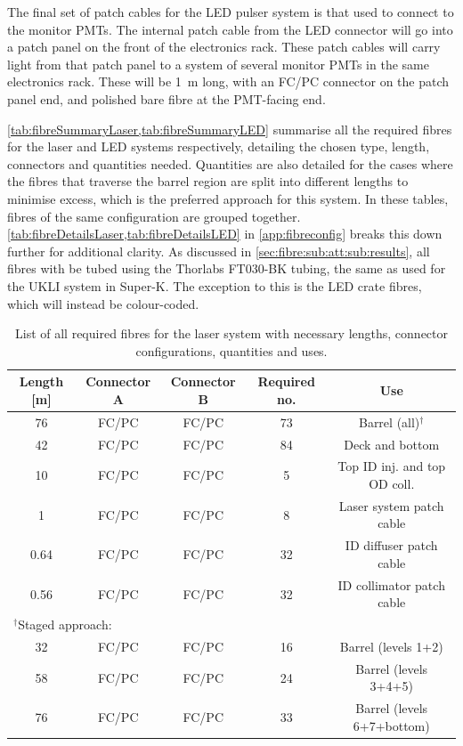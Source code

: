 \documentclass[a4paper,11pt]{article}
\begin{document}
The final set of patch cables for the LED pulser system is that used to connect to the monitor PMTs. The internal patch cable from the LED connector will go into a patch panel on the front of the electronics rack. These patch cables will carry light from that patch panel to a system of several monitor PMTs in the same electronics rack. These will be 1~m long, with an FC/PC connector on the patch panel end, and polished bare fibre at the PMT-facing end.

\cref{tab:fibreSummaryLaser,tab:fibreSummaryLED} summarise all the required fibres for the laser and LED systems respectively, detailing the chosen type, length, connectors and quantities needed. Quantities are also detailed for the cases where the fibres that traverse the barrel region are split into different lengths to minimise excess, which is the preferred approach for this system. In these tables, fibres of the same configuration are grouped together. \cref{tab:fibreDetailsLaser,tab:fibreDetailsLED} in \cref{app:fibreconfig} breaks this down further for additional clarity. As discussed in \cref{sec:fibre:sub:att:sub:results}, all fibres with be tubed using the Thorlabs FT030-BK tubing, the same as used for the UKLI system in Super-K. The exception to this is the LED crate fibres, which will instead be colour-coded.

\begin{table}[h]
\centering
\setlength{\tabcolsep}{4pt}
\begin{tabular}{ccccc}
\toprule
Length [m]	&	Connector A	&	Connector B	&	Required no.	&	Use		\\ \midrule
76			&	FC/PC		&	FC/PC		&	73				&	Barrel (all)$^\dagger$	\\
42			&	FC/PC		&	FC/PC		&	84				&	Deck and bottom	\\
10			&	FC/PC		&	FC/PC		&	5				&	Top ID inj. and top OD coll. \\
1			&	FC/PC		&	FC/PC		&	8				&	Laser system patch cable \\
0.64		&	FC/PC		&	FC/PC		&	32				&	ID diffuser patch cable	\\
0.56		&	FC/PC		&	FC/PC		&	32				&	ID collimator patch cable	\\ \midrule
\multicolumn{3}{l}{$^\dagger$Staged approach:}			&					&			\\
32			&	FC/PC		&	FC/PC		&	16				&	Barrel (levels 1+2) \\
58			&	FC/PC		&	FC/PC		&	24				&	Barrel (levels 3+4+5)	\\
76			&	FC/PC		&	FC/PC		&	33				&	Barrel (levels 6+7+bottom)	\\
\bottomrule
\end{tabular}
\caption{List of all required fibres for the laser system with necessary lengths, connector configurations, quantities and uses.}\label{tab:fibreSummaryLaser}
\end{table}
\end{document}
